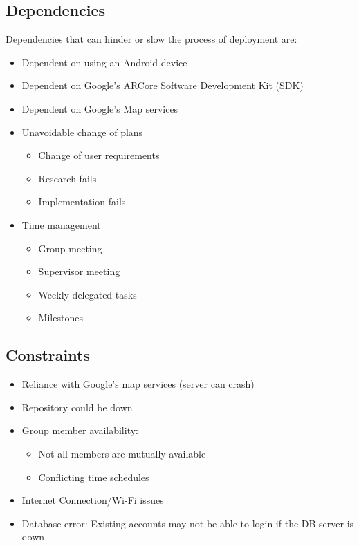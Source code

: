 \subsection{Dependencies}
Dependencies that can hinder or slow the process of deployment are:
\begin{itemize}
    \item Dependent on using an Android device
    \item Dependent on Google's ARCore Software Development Kit (SDK)
    \item Dependent on Google's Map services
    \item Unavoidable change of plans
    \begin{itemize}
        \item Change of user requirements
        \item Research fails
        \item Implementation fails
    \end{itemize}
    \item Time management
    \begin{itemize}
        \item Group meeting
        \item Supervisor meeting
        \item Weekly delegated tasks
        \item Milestones
    \end{itemize}
\end{itemize}

\subsection{Constraints}
\begin{itemize}
    \item Reliance with Google's map services (server can crash)
    \item Repository could be down
    \item Group member availability:
    \begin{itemize}
        \item Not all members are mutually available
        \item Conflicting time schedules
    \end{itemize}
    \item Internet Connection/Wi-Fi issues
    \item Database error: Existing accounts may not be able to login if the DB server is down
\end{itemize}

